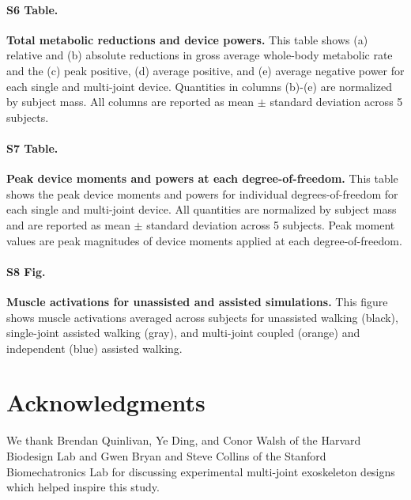 \documentclass[10pt,letterpaper]{article}
\begin{document}
\paragraph*{S6 Table.}
\label{S6_Table}
{\bf Total metabolic reductions and device powers.} This table shows (a) relative and (b) absolute reductions in gross average whole-body metabolic rate and the (c) peak positive, (d) average positive, and (e) average negative power for each single and multi-joint device. Quantities in columns (b)-(e) are normalized by subject mass. All columns are reported as mean $\pm$ standard deviation across 5 subjects.

\paragraph*{S7 Table.}
\label{S7_Table}
{\bf Peak device moments and powers at each degree-of-freedom.} This table shows the peak device moments and powers for individual degrees-of-freedom for each single and multi-joint device. All quantities are normalized by subject mass and are reported as mean $\pm$ standard deviation across 5 subjects. Peak moment values are peak magnitudes of device moments applied at each degree-of-freedom.

\paragraph*{S8 Fig.}
\label{S8_Fig}
{\bf Muscle activations for unassisted and assisted simulations.} This figure shows muscle activations averaged across subjects for unassisted walking (black), single-joint assisted walking (gray), and multi-joint coupled (orange) and independent (blue) assisted walking.

\section*{Acknowledgments}
We thank Brendan Quinlivan, Ye Ding, and Conor Walsh of the Harvard Biodesign Lab and Gwen Bryan and Steve Collins of the Stanford Biomechatronics Lab for discussing experimental multi-joint exoskeleton designs which helped inspire this study. 

\nolinenumbers


\end{document}
